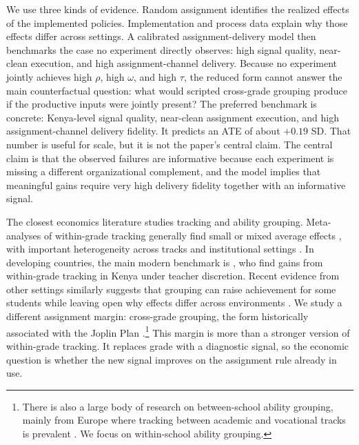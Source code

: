 \documentclass[11pt]{article}
\begin{document}
We use three kinds of evidence. Random assignment identifies the realized effects of the implemented policies. Implementation and process data explain why those effects differ across settings. A calibrated assignment-delivery model then benchmarks the case no experiment directly observes: high signal quality, near-clean execution, and high assignment-channel delivery. Because no experiment jointly achieves high $\rho$, high $\omega$, and high $\tau$, the reduced form cannot answer the main counterfactual question: what would scripted cross-grade grouping produce if the productive inputs were jointly present? The preferred benchmark is concrete: Kenya-level signal quality, near-clean assignment execution, and high assignment-channel delivery fidelity. It predicts an ATE of about $+0.19$ SD. That number is useful for scale, but it is not the paper's central claim. The central claim is that the observed failures are informative because each experiment is missing a different organizational complement, and the model implies that meaningful gains require very high delivery fidelity together with an informative signal.

The closest economics literature studies tracking and ability grouping. Meta-analyses of within-grade tracking generally find small or mixed average effects \citep{slavin1987ability,slavin1990achievement,kulik1987effects,terrin2022effect}, with important heterogeneity across tracks and institutional settings \citep{burke2013classroom,hoxby2005taking,antecol2016peer,garlick,de2022college}. In developing countries, the main modern benchmark is \citet{duflo2011peer}, who find gains from within-grade tracking in Kenya under teacher discretion. Recent evidence from other settings similarly suggests that grouping can raise achievement for some students while leaving open why effects differ across environments \citep{bussofrisancho2023}. We study a different assignment margin: cross-grade grouping, the form historically associated with the Joplin Plan \citep{floyd:1954,slavin1987ability,gutierrezslavin1992}.\footnote{There is also a large body of research on between-school ability grouping, mainly from Europe where tracking between academic and vocational tracks is prevalent \citep{fu2018ability,lavrijsen2015new}. We focus on within-school ability grouping.} This margin is more than a stronger version of within-grade tracking. It replaces grade with a diagnostic signal, so the economic question is whether the new signal improves on the assignment rule already in use.
\end{document}
